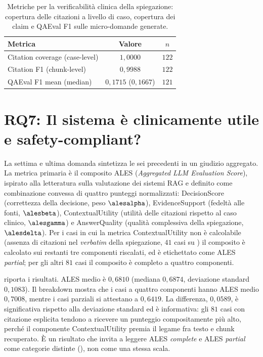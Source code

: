 \begin{table}[t]
  \centering
  \caption{Metriche per la verificabilità clinica della spiegazione: copertura delle citazioni a livello di caso, copertura dei claim e QAEval F1 sulle micro-domande generate.}
  \label{tab:rq6}
  \small
  \begin{tabular}{lcc}
    \toprule
    Metrica & Valore & $n$ \\
    \midrule
    Citation coverage (case-level) & $1{,}0000$ & $122$ \\
    Citation F1 (chunk-level)      & $0{,}9988$ & $122$ \\
    QAEval F1 mean (median)        & $0{,}1715$ ($0{,}1667$) & $121$ \\
    \bottomrule
  \end{tabular}
\end{table}

\section{RQ7: Il sistema è clinicamente utile e safety-compliant?}
\label{sec:rq7}

La settima e ultima domanda sintetizza le sei precedenti in un giudizio aggregato. La metrica primaria è il composito ALES (\emph{Aggregated LLM Evaluation Score}), ispirato alla letteratura sulla valutazione dei sistemi RAG e definito come combinazione convessa di quattro punteggi normalizzati: DecisionScore (correttezza della decisione, peso $\alesalpha$), EvidenceSupport (fedeltà alle fonti, $\alesbeta$), ContextualUtility (utilità delle citazioni rispetto al caso clinico, $\alesgamma$) e AnswerQuality (qualità complessiva della spiegazione, $\alesdelta$). Per i casi in cui la metrica ContextualUtility non è calcolabile (assenza di citazioni nel \emph{verbatim} della spiegazione, $41$ casi su \goldn) il composito è calcolato sui restanti tre componenti riscalati, ed è etichettato come ALES \emph{partial}; per gli altri $81$ casi il composito è completo a quattro componenti.

 riporta i risultati. ALES medio è $0{,}6810$ (mediana $0{,}6874$, deviazione standard $0{,}1083$). Il breakdown mostra che i casi a quattro componenti hanno ALES medio $0{,}7008$, mentre i casi parziali si attestano a $0{,}6419$. La differenza, $0{,}0589$, è significativa rispetto alla deviazione standard ed è informativa: gli $81$ casi con citazione esplicita tendono a ricevere un punteggio compositamente più alto, perché il componente ContextualUtility premia il legame fra testo e chunk recuperato. È un risultato che invita a leggere ALES \emph{complete} e ALES \emph{partial} come categorie distinte (), non come una stessa scala.

